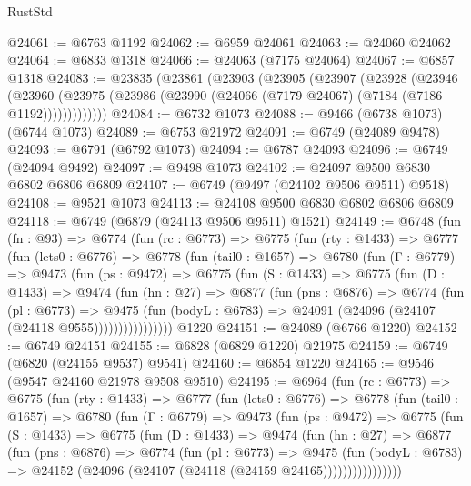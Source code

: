 \begin{lexlean}{RustStd}
\begin{coremodule}
@24061 := @6763 @1192
@24062 := @6959 @24061
@24063 := @24060 @24062
@24064 := @6833 @1318
@24066 := @24063 (@7175 @24064)
@24067 := @6857 @1318
@24083 := @23835
    (@23861
      (@23903
        (@23905
          (@23907
            (@23928
              (@23946
                (@23960
                  (@23975 (@23986 (@23990 (@24066 (@7179 @24067) (@7184 (@7186 @1192)))))))))))))
@24084 := @6732 @1073
@24088 := @9466 (@6738 @1073) (@6744 @1073)
@24089 := @6753 @21972
@24091 := @6749 (@24089 @9478)
@24093 := @6791 (@6792 @1073)
@24094 := @6787 @24093
@24096 := @6749 (@24094 @9492)
@24097 := @9498 @1073
@24102 := @24097 @9500 @6830 @6802 @6806 @6809
@24107 := @6749 (@9497 (@24102 @9506 @9511) @9518)
@24108 := @9521 @1073
@24113 := @24108 @9500 @6830 @6802 @6806 @6809
@24118 := @6749 (@6879 (@24113 @9506 @9511) @1521)
@24149 := @6748
    (fun (fn : @93) =>
    @6774
      (fun (rc : @6773) =>
      @6775
        (fun (rty : @1433) =>
        @6777
          (fun (lets0 : @6776) =>
          @6778
            (fun (tail0 : @1657) =>
            @6780
              (fun (Γ : @6779) =>
              @9473
                (fun (ps : @9472) =>
                @6775
                  (fun (S : @1433) =>
                  @6775
                    (fun (D : @1433) =>
                    @9474
                      (fun (hn : @27) =>
                      @6877
                        (fun (pns : @6876) =>
                        @6774
                          (fun (pl : @6773) =>
                          @9475
                            (fun (bodyL : @6783) =>
                            @24091 (@24096 (@24107 (@24118 @9555))))))))))))))))
    @1220
@24151 := @24089 (@6766 @1220)
@24152 := @6749 @24151
@24155 := @6828 (@6829 @1220) @21975
@24159 := @6749 (@6820 (@24155 @9537) @9541)
@24160 := @6854 @1220
@24165 := @9546 (@9547 @24160 @21978 @9508 @9510)
@24195 := @6964
    (fun (rc : @6773) =>
    @6775
      (fun (rty : @1433) =>
      @6777
        (fun (lets0 : @6776) =>
        @6778
          (fun (tail0 : @1657) =>
          @6780
            (fun (Γ : @6779) =>
            @9473
              (fun (ps : @9472) =>
              @6775
                (fun (S : @1433) =>
                @6775
                  (fun (D : @1433) =>
                  @9474
                    (fun (hn : @27) =>
                    @6877
                      (fun (pns : @6876) =>
                      @6774
                        (fun (pl : @6773) =>
                        @9475
                          (fun (bodyL : @6783) =>
                          @24152 (@24096 (@24107 (@24118 (@24159 @24165))))))))))))))))

\end{coremodule}
\end{lexlean}
